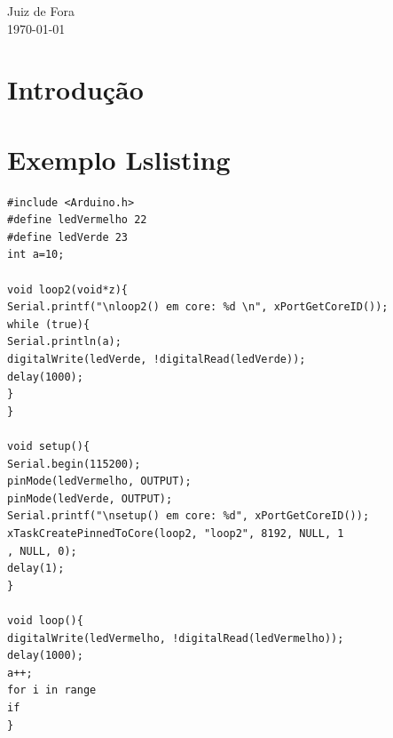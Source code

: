 \documentclass[a4paper, 12pt]{article}
\begin{document}
\begin{titlepage}
\begin{flushright}
\begin{list}{}{
      \setlength{\leftmargin}{4.5cm}
      \setlength{\rightmargin}{0cm}
      \setlength{\labelwidth}{0pt}
      \setlength{\labelsep}{\leftmargin}}
\begin{list}{}{
      \setlength{\leftmargin}{0cm}
      \setlength{\rightmargin}{0cm}
      \setlength{\labelwidth}{0pt}
      \setlength{\labelsep}{\leftmargin}}
      \end{list}
   \end{list}
\end{flushright}
\vspace{1cm}
\begin{center}
		\vspace{\fill}
		 Juiz de Fora\\
		 \today
			\end{center}
\end{titlepage}
\newpage
\newpage
\tableofcontents
\thispagestyle{empty}

\newpage
{}
\listoffigures
\newpage
\listoftables
\newpage

\section{Introdução}
\newpage
\section{Exemplo Lslisting}

\begin{lstlisting}[label=Multiprocessamento,caption=Multiprocessamento]
#include <Arduino.h>
#define ledVermelho 22
#define ledVerde 23
int a=10;

void loop2(void*z){
Serial.printf("\nloop2() em core: %d \n", xPortGetCoreID());
while (true){
Serial.println(a);
digitalWrite(ledVerde, !digitalRead(ledVerde));
delay(1000);
}
}

void setup(){
Serial.begin(115200);
pinMode(ledVermelho, OUTPUT);
pinMode(ledVerde, OUTPUT);
Serial.printf("\nsetup() em core: %d", xPortGetCoreID());
xTaskCreatePinnedToCore(loop2, "loop2", 8192, NULL, 1
, NULL, 0);
delay(1);
}

void loop(){
digitalWrite(ledVermelho, !digitalRead(ledVermelho));
delay(1000);
a++;
for i in range
if
}
\end{lstlisting}

\newpage



%

\end{document}
